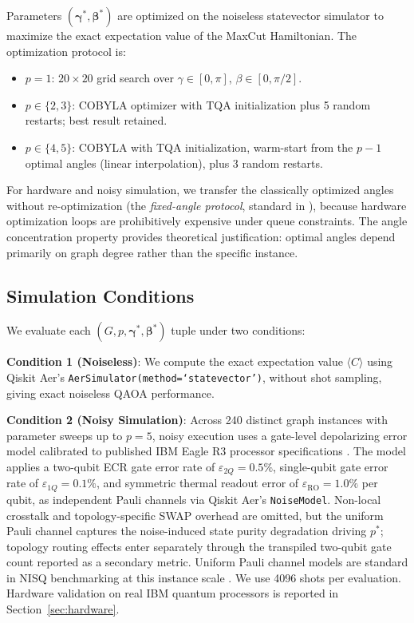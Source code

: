 \documentclass[12pt]{article}
\begin{document}
Parameters $(\boldsymbol{\gamma}^*, \boldsymbol{\beta}^*)$ are optimized on the noiseless statevector simulator to maximize the exact expectation value of the MaxCut Hamiltonian. The optimization protocol is:
\begin{itemize}
  \item $p = 1$: $20 \times 20$ grid search over $\gamma \in [0, \pi]$, $\beta \in [0, \pi/2]$.
  \item $p \in \{2, 3\}$: COBYLA optimizer with TQA initialization plus 5 random restarts; best result retained.
  \item $p \in \{4, 5\}$: COBYLA with TQA initialization, warm-start from the $p-1$ optimal angles (linear interpolation), plus 3 random restarts.
\end{itemize}

For hardware and noisy simulation, we transfer the classically optimized angles without re-optimization (the \emph{fixed-angle protocol}, standard in \cite{harrigan2021quantum}), because hardware optimization loops are prohibitively expensive under queue constraints. The angle concentration property \cite{zhou2020qaoa} provides theoretical justification: optimal angles depend primarily on graph degree rather than the specific instance.

\subsection{Simulation Conditions}

We evaluate each $(G, p, \boldsymbol{\gamma}^*, \boldsymbol{\beta}^*)$ tuple under two conditions:

\textbf{Condition 1 (Noiseless)}: We compute the exact expectation value $\langle C \rangle$ using Qiskit Aer's \texttt{AerSimulator(method=`statevector')}, without shot sampling, giving exact noiseless QAOA performance.

\textbf{Condition 2 (Noisy Simulation)}: Across 240 distinct graph instances with parameter sweeps up to $p = 5$, noisy execution uses a gate-level depolarizing error model calibrated to published IBM Eagle R3 processor specifications \cite{preskill2018nisq}. The model applies a two-qubit ECR gate error rate of $\varepsilon_{2Q} = 0.5\%$, single-qubit gate error rate of $\varepsilon_{1Q} = 0.1\%$, and symmetric thermal readout error of $\varepsilon_{\text{RO}} = 1.0\%$ per qubit, as independent Pauli channels via Qiskit Aer's \texttt{NoiseModel}. Non-local crosstalk and topology-specific SWAP overhead are omitted, but the uniform Pauli channel captures the noise-induced state purity degradation driving $p^*$; topology routing effects enter separately through the transpiled two-qubit gate count reported as a secondary metric. Uniform Pauli channel models are standard in NISQ benchmarking at this instance scale \cite{bharti2022noisy}. We use 4096 shots per evaluation. Hardware validation on real IBM quantum processors is reported in Section~\ref{sec:hardware}.
\end{document}
